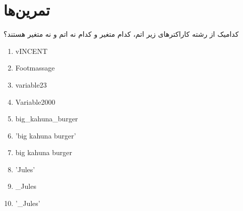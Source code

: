 \section{تمرین‌ها}
\begin{exercise}
کدامیک از رشته‌ کاراکترهای زیر اتم، کدام‌ متغیر و کدام نه اتم و نه متغیر هستند؟\\
\begin{latin}
\begin{enumerate}
\item vINCENT
\item Footmassage
\item variable23
\item Variable2000
\item big\_kahuna\_burger
\item 'big  kahuna  burger'
\item big  kahuna  burger
\item 'Jules'
\item \_Jules
\item '\_Jules'
\end{enumerate}
\end{latin}
\end{exercise}
